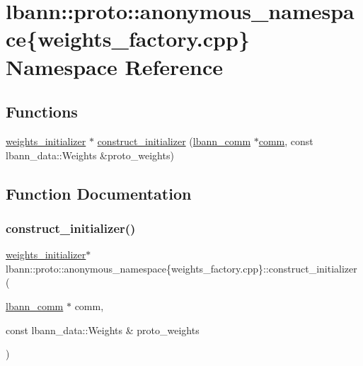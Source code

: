 \hypertarget{namespacelbann_1_1proto_1_1anonymous__namespace_02weights__factory_8cpp_03}{}\section{lbann\+:\+:proto\+:\+:anonymous\+\_\+namespace\{weights\+\_\+factory.\+cpp\} Namespace Reference}
\label{namespacelbann_1_1proto_1_1anonymous__namespace_02weights__factory_8cpp_03}
\subsection*{Functions}
\begin{DoxyCompactItemize}
\item 
\hyperlink{classlbann_1_1weights__initializer}{weights\+\_\+initializer} $\ast$ \hyperlink{namespacelbann_1_1proto_1_1anonymous__namespace_02weights__factory_8cpp_03_a2bbaafd93915c6f2334e16f0afcd4ee5}{construct\+\_\+initializer} (\hyperlink{classlbann_1_1lbann__comm}{lbann\+\_\+comm} $\ast$\hyperlink{file__io_8cpp_ab048c6f9fcbcfaa57ce68b00263dbebe}{comm}, const lbann\+\_\+data\+::\+Weights \&proto\+\_\+weights)
\end{DoxyCompactItemize}


\subsection{Function Documentation}
\mbox{\label{namespacelbann_1_1proto_1_1anonymous__namespace_02weights__factory_8cpp_03_a2bbaafd93915c6f2334e16f0afcd4ee5}} 
\subsubsection{\texorpdfstring{construct\+\_\+initializer()}{construct\_initializer()}}
{\footnotesize\ttfamily \hyperlink{classlbann_1_1weights__initializer}{weights\+\_\+initializer}$\ast$ lbann\+::proto\+::anonymous\+\_\+namespace\{weights\+\_\+factory.\+cpp\}\+::construct\+\_\+initializer (\begin{DoxyParamCaption}\item[{\hyperlink{classlbann_1_1lbann__comm}{lbann\+\_\+comm} $\ast$}]{comm,  }\item[{const lbann\+\_\+data\+::\+Weights \&}]{proto\+\_\+weights }\end{DoxyParamCaption})}

